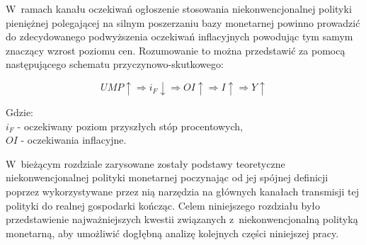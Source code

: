 W~ramach kanału oczekiwań ogłoszenie stosowania niekonwencjonalnej polityki pieniężnej polegającej na silnym poszerzaniu bazy monetarnej powinno prowadzić do zdecydowanego podwyższenia oczekiwań inflacyjnych powodując tym samym znaczący wzrost poziomu cen. Rozumowanie to można przedstawić za pomocą następującego schematu przyczynowo-skutkowego:

\begin{equation}
UMP\uparrow \Longrightarrow i_F\downarrow \Longrightarrow OI\uparrow \Longrightarrow I\uparrow \Longrightarrow Y\uparrow	
\end{equation}
\vspace{-1cm}
\begin{adjustwidth}{2.5em}{0pt}
{\footnotesize Gdzie: \\ 
$i_F$ - oczekiwany poziom przyszłych stóp procentowych,\\
$OI$ - oczekiwania inflacyjne.}
\end{adjustwidth}
\vspace{0.3cm}

W~bieżącym rozdziale zarysowane zostały podstawy teoretyczne niekonwencjonalnej polityki monetarnej poczynając od jej spójnej definicji poprzez wykorzystywane przez nią narzędzia na głównych kanałach transmisji tej polityki do realnej gospodarki kończąc. Celem niniejszego rozdziału było przedstawienie najważniejszych kwestii związanych z~niekonwencjonalną polityką monetarną, aby umożliwić dogłębną analizę kolejnych części niniejszej pracy. 
